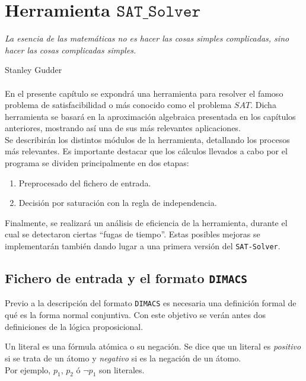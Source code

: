 \chapter{Herramienta $\mathtt{SAT\_Solver}$}

\hfil \textit{La esencia de las matemáticas no es hacer las cosas simples complicadas, sino hacer las cosas complicadas simples.}

\hfil \hfil \hfil  Stanley Gudder \\\\

En el presente capítulo se expondrá una herramienta para resolver el famoso problema de satisfacibilidad o más conocido como el problema $SAT$. Dicha herramienta se basará en la aproximación algebraica presentada en los capítulos anteriores, mostrando así una de sus más relevantes aplicaciones. \\

Se describirán los distintos módulos de la herramienta, detallando los procesos más relevantes. Es importante destacar que los cálculos llevados a cabo por el programa se dividen principalmente en dos etapas:
\begin{enumerate}
\item Preprocesado del fichero de entrada.
\item Decisión por saturación con la regla de independencia.
\end{enumerate}

Finalmente, se realizará un análisis de eficiencia de la herramienta, durante el cual se detectaron ciertas ``fugas de tiempo''. Estas posibles mejoras se implementarán también dando lugar a una primera versión del \texttt{SAT-Solver}.

\newpage
\section{Fichero de entrada y el formato \texttt{DIMACS}}
Previo a la descripción del formato \texttt{DIMACS} es necesaria una definición formal de qué es la forma normal conjuntiva. Con este objetivo se verán antes dos definiciones de la lógica proposicional.

 Un literal es una fórmula atómica o su negación. Se dice que un literal es \textit{positivo} si se trata de un átomo y \textit{negativo} si es la negación de un átomo.\\

Por ejemplo, $p_1$, $p_2$ ó $\neg p_1$ son literales.

